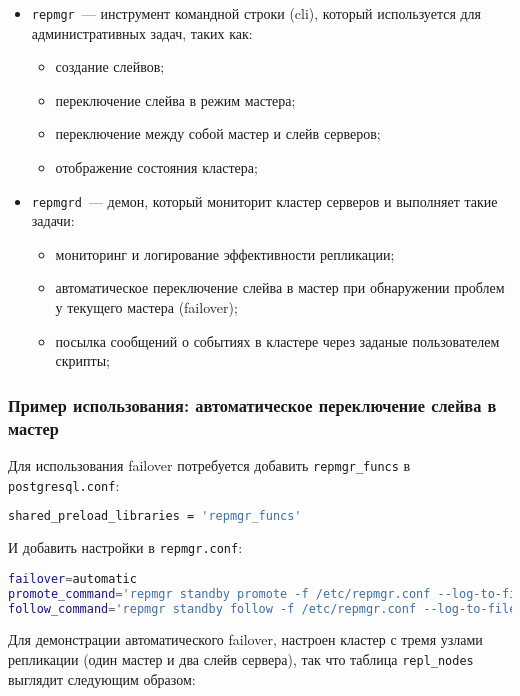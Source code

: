\begin{itemize}
  \item \lstinline!repmgr!~--- инструмент командной строки (cli), который используется для административных задач, таких как:
  \begin{itemize}
    \item создание слейвов;
    \item переключение слейва в режим мастера;
    \item переключение между собой мастер и слейв серверов;
    \item отображение состояния кластера;
  \end{itemize}
  \item \lstinline!repmgrd!~--- демон, который мониторит кластер серверов и выполняет такие задачи:
  \begin{itemize}
    \item мониторинг и логирование эффективности репликации;
    \item автоматическое переключение слейва в мастер при обнаружении проблем у текущего мастера (failover);
    \item посылка сообщений о событиях в кластере через заданые пользователем скрипты;
  \end{itemize}
\end{itemize}

\subsubsection{Пример использования: автоматическое переключение слейва в мастер}

Для использования failover потребуется добавить \lstinline!repmgr_funcs! в \lstinline!postgresql.conf!:

\begin{lstlisting}[language=Bash,label=lst:repmgr1,caption=repmgr\_funcs]
shared_preload_libraries = 'repmgr_funcs'
\end{lstlisting}

И добавить настройки в \lstinline!repmgr.conf!:

\begin{lstlisting}[language=Bash,label=lst:repmgr2,caption=repmgr.conf]
failover=automatic
promote_command='repmgr standby promote -f /etc/repmgr.conf --log-to-file'
follow_command='repmgr standby follow -f /etc/repmgr.conf --log-to-file'
\end{lstlisting}

Для демонстрации автоматического failover, настроен кластер с тремя узлами репликации (один мастер и два слейв сервера), так что таблица \lstinline!repl_nodes! выглядит следующим образом:


